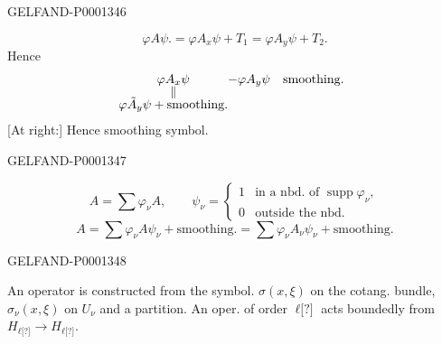 \begin{GelfandAdjacentEvidence}{GELFAND-P000134}{6}

\begin{equation*}\varphi A\psi\mathord{.}=\varphi A_x\psi+T_1=\varphi A_y\psi+T_2.\end{equation*}
Hence
\begin{equation*}
\begin{array}{@{}c@{}l}
\varphi A_x\psi&-\varphi A_y\psi\quad\text{smoothing.}\\[-2pt]
\Vert&\\[-2pt]
\varphi\tilde A_y\psi+\text{smoothing.}&
\end{array}
\end{equation*}
[At right:] Hence smoothing symbol.
\end{GelfandAdjacentEvidence}
\begin{GelfandAdjacentEvidence}{GELFAND-P000134}{7}


\begin{equation*}A=\sum\varphi_\nu A,\qquad\psi_\nu=\begin{cases}1&\text{in a nbd. of }\operatorname{supp}\varphi_\nu,\\0&\text{outside the nbd.}\end{cases}\end{equation*}
\begin{equation*}A=\sum\varphi_\nu A\psi_\nu+\text{smoothing.}=\sum\varphi_\nu A_\nu\psi_\nu+\text{smoothing.}\end{equation*}
\end{GelfandAdjacentEvidence}
\begin{GelfandAdjacentEvidence}{GELFAND-P000134}{8}

 An operator is constructed from the symbol. $\sigma (x,\xi)$ on the cotang. bundle, $\sigma_\nu (x,\xi)$ on $U_\nu$ and a partition.
An oper. of order $\ell\text{[?]}$ acts boundedly from $H_{\ell\text{[?]}}\to H_{\ell\text{[?]}}$.
\end{GelfandAdjacentEvidence}
